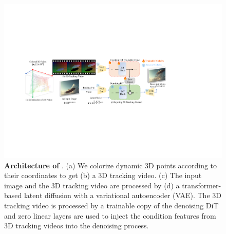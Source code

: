 \begin{figure}
    \centering
    \includegraphics[width=\textwidth]{pictures/pipeline.pdf}
    \caption{\textbf{Architecture of \methodname}. (a) We colorize dynamic 3D points according to their coordinates to get (b) a 3D tracking video. (c) The input image and the 3D tracking video are processed by (d) a transformer-based latent diffusion with a variational autoencoder (VAE). The 3D tracking video is processed by a trainable copy of the denoising DiT and zero linear layers are used to inject the condition features from 3D tracking videos into the denoising process.}
    \label{fig:pipe}
\end{figure}


